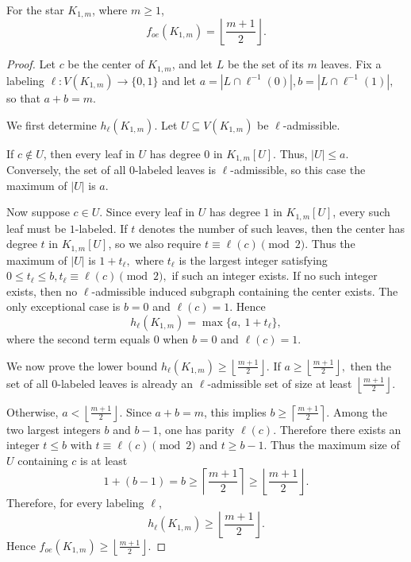 \documentclass[10pt,a4paper]{amsart}
\begin{document}
\begin{proposition}
For the star \(K_{1,m}\), where \(m\ge 1\),
\[
f_{oe}(K_{1,m})=\left\lfloor \frac{m+1}{2}\right\rfloor .
\]
\end{proposition}

\begin{proof}
Let \(c\) be the center of \(K_{1,m}\), and let \(L\) be the set of its \(m\) leaves.
Fix a labeling
$
\ell:V(K_{1,m})\to\{0,1\}
$ and 
let
$
a=|L\cap \ell^{-1}(0)|, b=|L\cap \ell^{-1}(1)|,
$
so that \(a+b=m\).

We first determine \(h_\ell(K_{1,m})\). Let \(U\subseteq V(K_{1,m})\) be
\(\ell\)-admissible.

If \(c\notin U\), then every leaf in $U$ has degree \(0\) in \(K_{1,m}[U]\).
Thus, $ |U|\le a.$
Conversely, the set of all \(0\)-labeled leaves is \(\ell\)-admissible, so this
case the maximum of  \(|U|\) is $a$.

Now suppose \(c\in U\). Since every leaf in $U$ has degree \(1\) in
\(K_{1,m}[U]\), every such leaf must be \(1\)-labeled. If \(t\) denotes the
number of such leaves, then the center has degree \(t\) in \(K_{1,m}[U]\),
so we also require
$
t\equiv \ell(c)\pmod 2.
$
Thus the maximum of $|U|$ is
\(
1+t_\ell,
\)
where \(t_\ell\) is the largest integer satisfying
\(
0\le t_\ell\le b, t_\ell\equiv \ell(c)\pmod 2,
\)
if such an integer exists. If no such integer exists, then no \(\ell\)-admissible
induced subgraph containing the center exists. The only exceptional case is
\(b=0\) and \(\ell(c)=1\). Hence
\[
h_\ell(K_{1,m})=\max\{a,\ 1+t_\ell\},
\]
where the second term equals \(0\) when \(b=0\) and \(\ell(c)=1\).

We now prove the lower bound $h_\ell(K_{1,m})\ge \left\lfloor\frac{m+1}{2}\right\rfloor.$ If
\(
a\ge \left\lfloor\frac{m+1}{2}\right\rfloor,
\)
then the set of all \(0\)-labeled leaves is already an \(\ell\)-admissible set
of size at least \(\left\lfloor\frac{m+1}{2}\right\rfloor\).

Otherwise,
\(
a<\left\lfloor\frac{m+1}{2}\right\rfloor.
\)
Since \(a+b=m\), this implies
\(
b\ge \left\lceil\frac{m+1}{2}\right\rceil .
\)
Among the two largest integers \(b\) and \(b-1\), one has parity \(\ell(c)\).
Therefore there exists an integer \(t\le b\) with
\(
t\equiv \ell(c)\pmod 2
\)
and
\(
t\ge b-1.
\)
Thus the maximum size of $U$ containing \(c\) is at least
\[
1+(b-1)=b\ge \left\lceil\frac{m+1}{2}\right\rceil
\ge \left\lfloor\frac{m+1}{2}\right\rfloor .
\]
Therefore, for every labeling \(\ell\),
\[
h_\ell(K_{1,m})\ge \left\lfloor\frac{m+1}{2}\right\rfloor .
\]
Hence
\(
f_{oe}(K_{1,m})\ge \left\lfloor\frac{m+1}{2}\right\rfloor .
\)


\end{proof}
\end{document}
